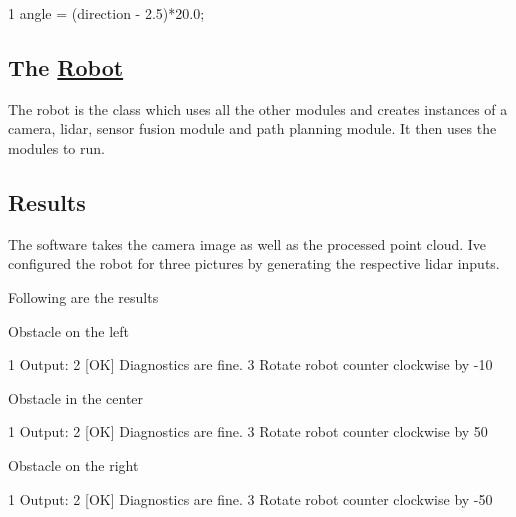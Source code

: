\begin{DoxyCode}
1 angle = (direction - 2.5)*20.0;
\end{DoxyCode}


\subsection*{The \hyperlink{class_robot}{Robot}}

The robot is the class which uses all the other modules and creates instances of a camera, lidar, sensor fusion module and path planning module. It then uses the modules to run. 

 



 \subsection*{Results}

The software takes the camera image as well as the processed point cloud. I\textquotesingle{}ve configured the robot for three pictures by generating the respective lidar inputs.

Following are the results
\begin{DoxyEnumerate}
\item Obstacle on the left 
\end{DoxyEnumerate}

 


\begin{DoxyCode}
1 Output:
2 [OK] Diagnostics are fine.
3 Rotate robot counter clockwise by -10
\end{DoxyCode}



\begin{DoxyEnumerate}
\item Obstacle in the center 
\end{DoxyEnumerate}

 


\begin{DoxyCode}
1 Output:
2 [OK] Diagnostics are fine.
3 Rotate robot counter clockwise by 50
\end{DoxyCode}



\begin{DoxyEnumerate}
\item Obstacle on the right 
\end{DoxyEnumerate}

 


\begin{DoxyCode}
1 Output:
2 [OK] Diagnostics are fine.
3 Rotate robot counter clockwise by -50
\end{DoxyCode}
 

